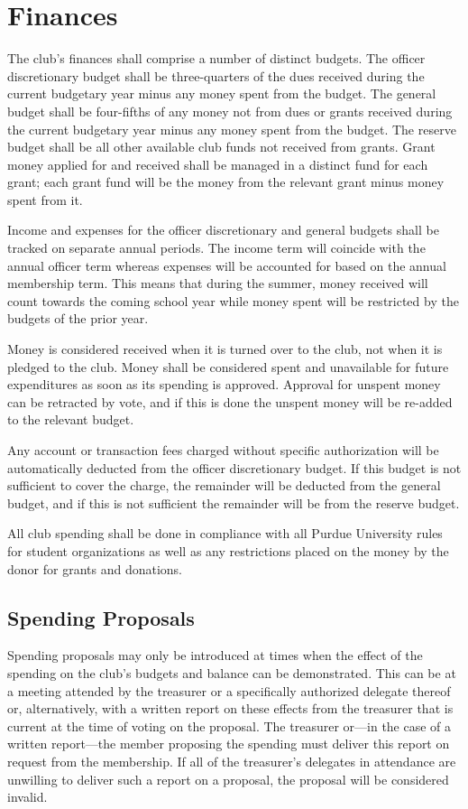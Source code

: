 \documentclass{article}
\begin{document}
\section{Finances}

The club's finances shall comprise a number of distinct budgets. The officer
discretionary budget shall be three-quarters of the dues received during the
current budgetary year minus any money spent from the budget. The general budget
shall be four-fifths of any money not from dues or grants received during the
current budgetary year minus any money spent from the budget. The reserve budget
shall be all other available club funds not received from grants. Grant money
applied for and received shall be managed in a distinct fund for each grant;
each grant fund will be the money from the relevant grant minus money spent from
it.

Income and expenses for the officer discretionary and general budgets shall be
tracked on separate annual periods. The income term will coincide with the
annual officer term whereas expenses will be accounted for based on the annual
membership term. This means that during the summer, money received will count
towards the coming school year while money spent will be restricted by the
budgets of the prior year.

Money is considered received when it is turned over to the club, not when it is
pledged to the club. Money shall be considered spent and unavailable for future
expenditures as soon as its spending is approved. Approval for unspent money can
be retracted by vote, and if this is done the unspent money will be re-added to
the relevant budget.

Any account or transaction fees charged without specific authorization will be
automatically deducted from the officer discretionary budget. If this budget is
not sufficient to cover the charge, the remainder will be deducted from the
general budget, and if this is not sufficient the remainder will be from the
reserve budget.

All club spending shall be done in compliance with all Purdue University rules
for student organizations as well as any restrictions placed on the money by the
donor for grants and donations.

\subsection{Spending Proposals}

Spending proposals may only be introduced at times when the effect of the
spending on the club's budgets and balance can be demonstrated. This can be at a
meeting attended by the treasurer or a specifically authorized delegate thereof
or, alternatively, with a written report on these effects from the treasurer
that is current at the time of voting on the proposal. The treasurer or---in the
case of a written report---the member proposing the spending must deliver this
report on request from the membership. If all of the treasurer's delegates in
attendance are unwilling to deliver such a report on a proposal, the proposal
will be considered invalid.
\end{document}

